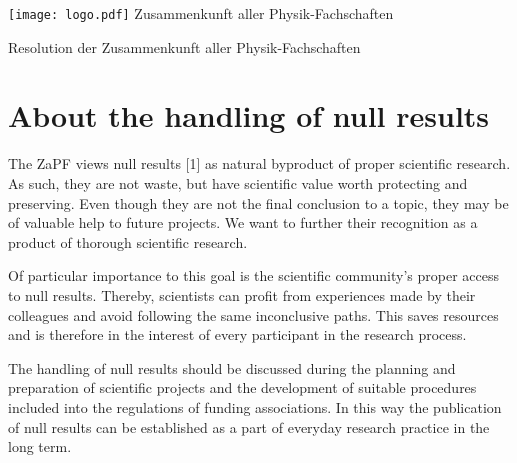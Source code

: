 \documentclass[DIV=calc]{scrartcl}
\begin{document}
    \hspace{0.87\textwidth}
    \begin{minipage}{120pt}
        \vspace{-1.8cm}
        \texttt{[image: logo.pdf]}
        \centering
        \small Zusammenkunft aller Physik-Fachschaften
    \end{minipage}
    \begin{center}
        \huge{Resolution der Zusammenkunft aller Physik-Fachschaften}\vspace{.25\baselineskip}\\
        \normalsize
    \end{center}
    \vspace{1cm} 
    \section*{About the handling of null results}
The ZaPF views null results [1] as natural byproduct of proper scientific research. As such, they are not waste, but have scientific value worth protecting and preserving. Even though they are not the final conclusion to a topic, they may be of valuable help to future projects. We want to further their recognition as a product of thorough scientific research.

Of particular importance to this goal is the scientific community's proper access to null results. Thereby, scientists can profit from experiences made by their colleagues and avoid following the same inconclusive paths. This saves resources and is therefore in the interest of every participant in the research process.

The handling of null results should be discussed during the planning and preparation of scientific projects and the development of suitable procedures included into the regulations of funding associations. In this way the publication of null results can be established as a part of everyday research practice in the long term.
\end{document}

